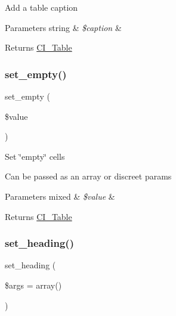 Add a table caption


\begin{DoxyParams}[1]{Parameters}
string & {\em \$caption} & \\
\hline
\end{DoxyParams}
\begin{DoxyReturn}{Returns}
\mbox{\hyperlink{class_c_i___table}{C\+I\+\_\+\+Table}} 
\end{DoxyReturn}
\mbox{\label{class_c_i___table_a20b008428100a2b740c02c4bcaa45cf6}} 
\subsubsection{\texorpdfstring{set\+\_\+empty()}{set\_empty()}}
{\footnotesize\ttfamily set\+\_\+empty (\begin{DoxyParamCaption}\item[{}]{\$value }\end{DoxyParamCaption})}

Set \char`\"{}empty\char`\"{} cells

Can be passed as an array or discreet params


\begin{DoxyParams}[1]{Parameters}
mixed & {\em \$value} & \\
\hline
\end{DoxyParams}
\begin{DoxyReturn}{Returns}
\mbox{\hyperlink{class_c_i___table}{C\+I\+\_\+\+Table}} 
\end{DoxyReturn}
\mbox{\label{class_c_i___table_ac35607094955ce966330d6af51d221ef}} 
\subsubsection{\texorpdfstring{set\+\_\+heading()}{set\_heading()}}
{\footnotesize\ttfamily set\+\_\+heading (\begin{DoxyParamCaption}\item[{}]{\$args = {\ttfamily array()} }\end{DoxyParamCaption})}

